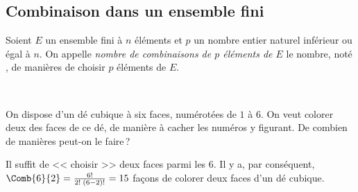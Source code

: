 				\subsection{Combinaison dans un ensemble fini}
					\begin{defi}
						Soient $E$ un ensemble fini \`a $n$ \'el\'ements et $p$ un nombre entier naturel inf\'erieur ou \'egal \`a $n$.
						On appelle \emph{nombre de combinaisons de $p$ \'el\'ements de $E$} le nombre, not\'e 
						,
							de mani\`eres de choisir $p$ \'el\'ements de $E$.
					\end{defi}
                  	\begin{prop}~\\[-1\baselineskip]
								\propbox{
									\[
										\Comb{n}{p} = \frac{n!}{p!\;(n-p)!}
									\]
								}
 						\end{prop}
 					\begin{ex}
	 						On dispose d'un d\'e cubique \`a six faces, num\'erot\'ees de $1$ \`a $6$.
 						On veut colorer deux des faces de ce d\'e, de mani\`ere \`a cacher les num\'eros y figurant.
 						De combien de mani\`eres peut-on le faire\,?
 						\begin{valiny}
	 						Il suffit de << choisir >> deux faces parmi les 6.
 							Il y a, par cons\'equent, 
 							$\Comb{6}{2} = \frac{6!}{2! \; (6-2)!} = 15$ fa\c{c}ons de colorer deux faces d'un d\'e cubique.
 						\end{valiny}
 					\end{ex}
%
